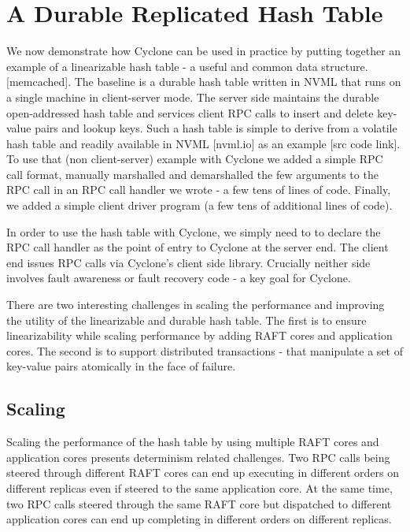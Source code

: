 \documentclass[letterpaper,twocolumn,10pt]{article}
\begin{document}
\section{A Durable Replicated Hash Table}
\label{sec:example}
We now demonstrate how Cyclone can be used in practice by putting together an
example of a linearizable hash table - a useful and common data structure.
[memcached]. The baseline is a durable hash table written in NVML that runs on a
single machine in client-server mode. The server side maintains the durable
open-addressed hash table and services client RPC calls to insert and delete
key-value pairs and lookup keys. Such a hash table is simple to derive from a
volatile hash table and readily available in NVML [nvml.io] as an example [src
  code link]. To use that (non client-server) example with Cyclone we added a
simple RPC call format, manually marshalled and demarshalled the few
arguments to the RPC call in an RPC call handler we wrote - a few tens of lines
of code. Finally, we added a simple client driver program (a few tens of
additional lines of code).

In order to use the hash table with Cyclone, we simply need to to declare the
RPC call handler as the point of entry to Cyclone at the server end.  The client
end issues RPC calls via Cyclone's client side library. Crucially neither side
involves fault awareness or fault recovery code - a key goal for Cyclone.

There are two interesting challenges in scaling the performance and improving
the utility of the linearizable and durable hash table. The first is to ensure
linearizability while scaling performance by adding RAFT cores and application
cores. The second is to support distributed transactions - that manipulate a set
of key-value pairs atomically in the face of failure.

\subsection{Scaling}
Scaling the performance of the hash table by using multiple RAFT cores and
application cores presents determinism related challenges. Two RPC calls being
steered through different RAFT cores can end up executing in different orders on
different replicas even if steered to the same application core. At the same time,
two RPC calls steered through the same RAFT core but dispatched to different
application cores can end up completing in different orders on different replicas.
\end{document}
